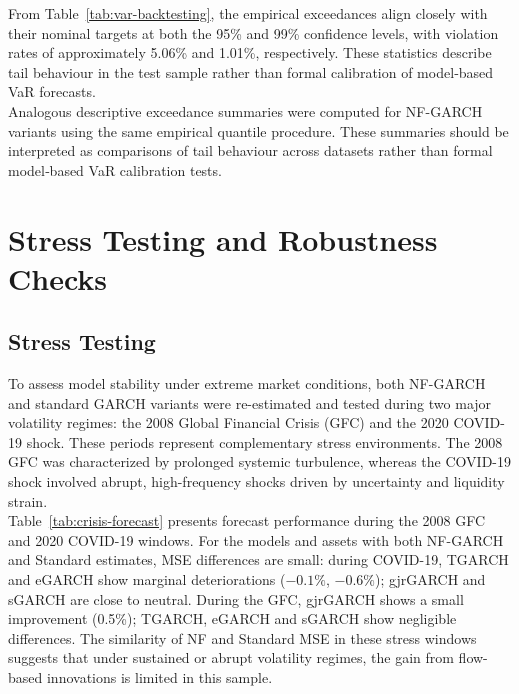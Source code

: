 \documentclass[oneside,12pt]{CUEDthesisPSnPDF}
\begin{document}
From Table~\ref{tab:var-backtesting}, the empirical exceedances align closely with their nominal targets at both the 95\% and 99\% confidence levels, with violation rates of approximately 5.06\% and 1.01\%, respectively. These statistics describe tail behaviour in the test sample rather than formal calibration of model‑based VaR forecasts.\\

Analogous descriptive exceedance summaries were computed for NF-GARCH variants using the same empirical quantile procedure. These summaries should be interpreted as comparisons of tail behaviour across datasets rather than formal model‑based VaR calibration tests.\\


\section{Stress Testing and Robustness Checks}
\label{sec:stress_results}
\subsection{Stress Testing}
\noindent
To assess model stability under extreme market conditions, both NF-GARCH and standard GARCH variants were re-estimated and tested during two major volatility regimes: the 2008 Global Financial Crisis (GFC) and the 2020 COVID-19 shock. These periods represent complementary stress environments. The 2008 GFC was characterized by prolonged systemic turbulence, whereas the COVID-19 shock involved abrupt, high-frequency shocks driven by uncertainty and liquidity strain.\\

Table~\ref{tab:crisis-forecast} presents forecast performance during the 2008 GFC and 2020 COVID-19 windows. For the models and assets with both NF-GARCH and Standard estimates, MSE differences are small: during COVID-19, TGARCH and eGARCH show marginal deteriorations ($-0.1\%$, $-0.6\%$); gjrGARCH and sGARCH are close to neutral. During the GFC, gjrGARCH shows a small improvement (0.5\%); TGARCH, eGARCH and sGARCH show negligible differences. The similarity of NF and Standard MSE in these stress windows suggests that under sustained or abrupt volatility regimes, the gain from flow-based innovations is limited in this sample.\\
\end{document}
